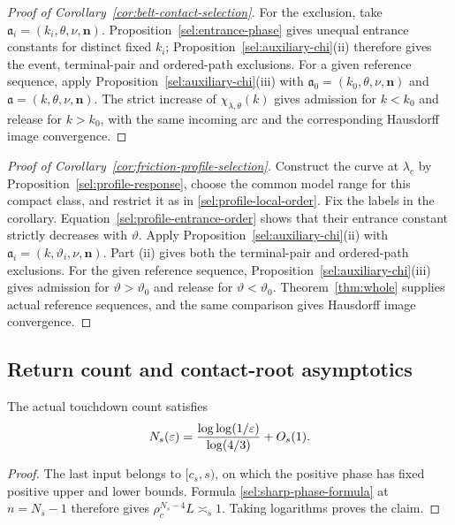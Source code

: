 

\begin{proof}[Proof of Corollary~\ref{cor:belt-contact-selection}]
For the exclusion, take $\mathfrak a_i=(k_i,\theta,\nu,\mathbf n)$.
Proposition~\ref{sel:entrance-phase} gives unequal entrance constants
for distinct fixed $k_i$; Proposition~\ref{sel:auxiliary-chi}\textup{(ii)}
therefore gives the event, terminal-pair and ordered-path exclusions.
For a given reference sequence, apply Proposition~\ref{sel:auxiliary-chi}\textup{(iii)} with
$\mathfrak a_0=(k_0,\theta,\nu,\mathbf n)$ and
$\mathfrak a=(k,\theta,\nu,\mathbf n)$. The strict increase of
$\chi_{\lambda,\theta}(k)$ gives admission for $k<k_0$ and release
for $k>k_0$, with the same incoming arc and the corresponding
Hausdorff image convergence.
\end{proof}




\begin{proof}[Proof of Corollary~\ref{cor:friction-profile-selection}]
Construct the curve at $\lambda_c$ by
Proposition~\ref{sel:profile-response}, choose the common model
range for this compact class, and restrict it as in
\eqref{sel:profile-local-order}. Fix the labels in the corollary.
Equation~\eqref{sel:profile-entrance-order} shows that their entrance
constant strictly decreases with $\vartheta$. Apply
Proposition~\ref{sel:auxiliary-chi}\textup{(ii)} with
$\mathfrak a_i=(k,\vartheta_i,\nu,\mathbf n)$.
Part \textup{(ii)} gives both the terminal-pair and ordered-path
exclusions. For the given reference sequence,
Proposition~\ref{sel:auxiliary-chi}\textup{(iii)} gives admission for
$\vartheta>\vartheta_0$ and release for $\vartheta<\vartheta_0$.
Theorem~\ref{thm:whole} supplies actual reference sequences, and
the same comparison gives Hausdorff image convergence.
\end{proof}

\subsection{Return count and contact-root asymptotics}

\begin{corollary}
\label{sel:return-count}
The actual touchdown count satisfies
\begin{equation}
 N_s(\varepsilon)=\frac{\log\log(1/\varepsilon)}{\log(4/3)}+O_s(1).
 \label{sel:count}
\end{equation}
\end{corollary}
\begin{proof}
The last input belongs to $[c_s,s)$, on which the positive phase
has fixed positive upper and lower bounds. Formula
\eqref{sel:sharp-phase-formula} at $n=N_s-1$ therefore gives
$\rho_c^{N_s-4}L\asymp_s1$. Taking logarithms proves the claim.
\end{proof}


